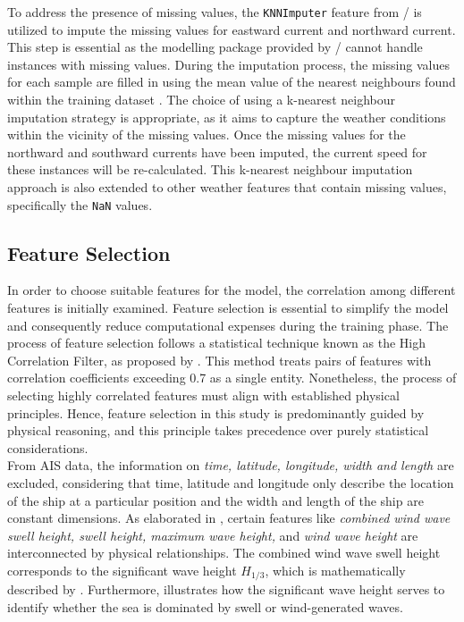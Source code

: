 To address the presence of missing values, the \texttt{KNNImputer} feature from \scikit/ is utilized to impute the missing values for eastward current and northward current. This step is essential as the modelling package provided by \scikit/ cannot handle instances with missing values. During the imputation process, the missing values for each sample are filled in using the mean value of the nearest neighbours found within the training dataset . The choice of using a k-nearest neighbour imputation strategy is appropriate, as it aims to capture the weather conditions within the vicinity of the missing values. Once the missing values for the northward and southward currents have been imputed, the current speed for these instances will be re-calculated. This k-nearest neighbour imputation approach is also extended to other weather features that contain missing values, specifically the \texttt{NaN} values.\\

\subsection{Feature Selection}\label{sec:feature_select}

In order to choose suitable features for the model, the correlation among different features is initially examined. Feature selection is essential to simplify the model and consequently reduce computational expenses during the training phase. The process of feature selection follows a statistical technique known as the High Correlation Filter, as proposed by . This method treats pairs of features with correlation coefficients exceeding 0.7 as a single entity. Nonetheless, the process of selecting highly correlated features must align with established physical principles. Hence, feature selection in this study is predominantly guided by physical reasoning, and this principle takes precedence over purely statistical considerations.\\

From AIS data, the information on \emph{time, latitude, longitude, width and length} are excluded, considering that time, latitude and longitude only describe the location of the ship at a particular position and the width and length of the ship are constant dimensions. As elaborated in , certain features like \emph{combined wind wave swell height, swell height, maximum wave height,} and \emph{wind wave height} are interconnected by physical relationships. The combined wind wave swell height corresponds to the significant wave height $H_{1/3}$, which is mathematically described by . Furthermore,  illustrates how the significant wave height serves to identify whether the sea is dominated by swell or wind-generated waves.\\

